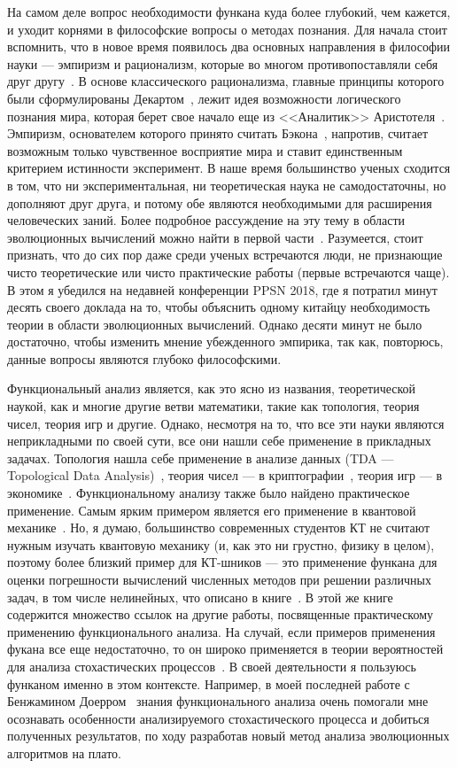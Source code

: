 \documentclass[russian]{article}
\begin{document}
На самом деле вопрос необходимости функана куда более глубокий, чем кажется, и уходит корнями в философские вопросы о методах познания. Для начала стоит вспомнить, что в новое время появилось два основных направления в философии науки --- эмпиризм и рационализм, которые во многом противопоставляли себя друг другу~\cite{phil}. В основе классического рационализма, главные принципы которого были сформулированы Декартом~\cite{descartes}, лежит идея возможности логического познания мира, которая берет свое начало еще из <<Аналитик>> Аристотеля~\cite{aristotel}. Эмпиризм, основателем которого принято считать Бэкона~\cite{bacon}, напротив, считает возможным только чувственное восприятие мира и ставит единственным критерием истинности эксперимент. В наше время большинство ученых сходится в том, что ни экспериментальная, ни теоретическая наука не самодостаточны, но дополняют друг друга, и потому обе являются необходимыми для расширения человеческих заний. Более подробное рассуждение на эту тему в области эволюционных вычислений можно найти в первой части~\cite{doerr}. Разумеется, стоит признать, что до сих пор даже среди ученых встречаются люди, не признающие чисто теоретические или чисто практические работы (первые встречаются чаще). В этом я убедился на недавней конференции PPSN 2018, где я потратил минут десять своего доклада на то, чтобы объяснить одному китайцу необходимость теории в области эволюционных вычислений. Однако десяти минут не было достаточно, чтобы изменить мнение убежденного эмпирика, так как, повторюсь, данные вопросы являются глубоко философскими.

Функциональный анализ является, как это ясно из названия, теоретической наукой, как и многие другие ветви математики, такие как топология, теория чисел, теория игр и другие. Однако, несмотря на то, что все эти науки являются неприкладными по своей сути, все они нашли себе применение в прикладных задачах. Топология нашла себе применение в анализе данных (TDA --- Topological Data Analysis)~\cite{topology}, теория чисел --- в криптографии~\cite{numbers}, теория игр --- в экономике~\cite{games}. Функциональному анализу также было найдено практическое применение. Самым ярким примером является его применение в квантовой механике~\cite{quantum}. Но, я думаю, большинство современных студентов КТ не считают нужным изучать квантовую механику (и, как это ни грустно, физику в целом), поэтому более близкий пример для КТ-шников --- это применение функана для оценки погрешности вычислений численных методов при решении различных задач, в том числе нелинейных, что описано в книге~\cite{kollats}. В этой же книге содержится множество ссылок на другие работы, посвященные практическому применению функционального анализа. На случай, если примеров применения фукана все еще недостаточно, то он широко применяется в теории вероятностей для анализа стохастических процессов~\cite{prob}. В своей деятельности я пользуюсь функаном именно в этом контексте. Например, в моей последней работе с Бенжамином Доерром~\cite{plateau} знания функционального анализа очень помогали мне осознавать особенности анализируемого стохастического процесса и добиться полученных результатов, по ходу разработав новый метод анализа эволюционных алгоритмов на плато.
\end{document}
